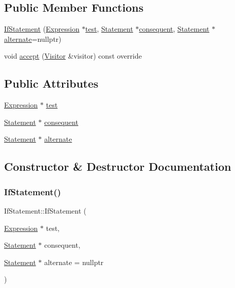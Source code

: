 \subsection*{Public Member Functions}
\begin{DoxyCompactItemize}
\item 
\hyperlink{struct_if_statement_aa34756942dc6b3c68abd60f697ea2237}{If\+Statement} (\hyperlink{struct_expression}{Expression} $\ast$\hyperlink{struct_if_statement_ab7d44c6a4d1e70ab2d1053a2b076b8df}{test}, \hyperlink{struct_statement}{Statement} $\ast$\hyperlink{struct_if_statement_a83d873df742779675de067315792ff8a}{consequent}, \hyperlink{struct_statement}{Statement} $\ast$\hyperlink{struct_if_statement_ab0ee82460f6279444d526b2fff26584b}{alternate}=nullptr)
\item 
void \hyperlink{struct_if_statement_a3b9cacb85a094dfe27646324769a1d2f}{accept} (\hyperlink{struct_visitor}{Visitor} \&visitor) const override
\end{DoxyCompactItemize}
\subsection*{Public Attributes}
\begin{DoxyCompactItemize}
\item 
\hyperlink{struct_expression}{Expression} $\ast$ \hyperlink{struct_if_statement_ab7d44c6a4d1e70ab2d1053a2b076b8df}{test}
\item 
\hyperlink{struct_statement}{Statement} $\ast$ \hyperlink{struct_if_statement_a83d873df742779675de067315792ff8a}{consequent}
\item 
\hyperlink{struct_statement}{Statement} $\ast$ \hyperlink{struct_if_statement_ab0ee82460f6279444d526b2fff26584b}{alternate}
\end{DoxyCompactItemize}


\subsection{Constructor \& Destructor Documentation}
\mbox{\label{struct_if_statement_aa34756942dc6b3c68abd60f697ea2237}} 
\subsubsection{\texorpdfstring{If\+Statement()}{IfStatement()}}
{\footnotesize\ttfamily If\+Statement\+::\+If\+Statement (\begin{DoxyParamCaption}\item[{\hyperlink{struct_expression}{Expression} $\ast$}]{test,  }\item[{\hyperlink{struct_statement}{Statement} $\ast$}]{consequent,  }\item[{\hyperlink{struct_statement}{Statement} $\ast$}]{alternate = {\ttfamily nullptr} }\end{DoxyParamCaption})\hspace{0.3cm}{\ttfamily [inline]}}




